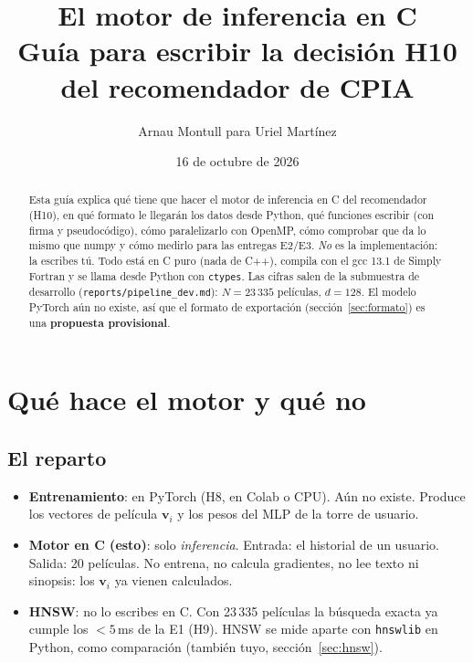 \documentclass[a4paper,11pt]{article}
\title{\textbf{El motor de inferencia en C}\\[4pt]
\large Guía para escribir la decisión H10 del recomendador de CPIA}
\author{Arnau Montull \quad para \quad Uriel Martínez}
\date{16 de octubre de 2026}
\newcommand{\cod}[1]{\texttt{#1}}
\begin{document}
\maketitle

\begin{abstract}
\noindent Esta guía explica qué tiene que hacer el motor de inferencia en C del recomendador (H10), en qué formato le
llegarán los datos desde Python, qué funciones escribir (con firma y pseudocódigo), cómo paralelizarlo con OpenMP,
cómo comprobar que da lo mismo que numpy y cómo medirlo para las entregas E2/E3. \emph{No} es la implementación: la
escribes tú. Todo está en C puro (nada de C++), compila con el gcc 13.1 de Simply Fortran y se llama desde Python con
\cod{ctypes}. Las cifras salen de la submuestra de desarrollo (\cod{reports/pipeline\_dev.md}): $N = 23\,335$
películas, $d = 128$. El modelo PyTorch aún no existe, así que el formato de exportación (sección~\ref{sec:formato}) es
una \textbf{propuesta provisional}.
\end{abstract}

\tableofcontents
\newpage

\section{Qué hace el motor y qué no}

\subsection{El reparto}
\begin{itemize}
  \item \textbf{Entrenamiento}: en PyTorch (H8, en Colab o CPU). Aún no existe. Produce los vectores de película
        $\mathbf{v}_i$ y los pesos del MLP de la torre de usuario.
  \item \textbf{Motor en C (esto)}: solo \emph{inferencia}. Entrada: el historial de un usuario. Salida: 20 películas.
        No entrena, no calcula gradientes, no lee texto ni sinopsis: los $\mathbf{v}_i$ ya vienen calculados.
  \item \textbf{HNSW}: no lo escribes en C. Con 23\,335 películas la búsqueda exacta ya cumple los $< 5$\,ms de la E1
        (H9). HNSW se mide aparte con \cod{hnswlib} en Python, como comparación (también tuyo, sección~\ref{sec:hnsw}).
\end{itemize}
\end{document}

